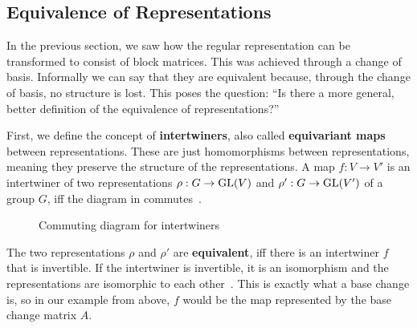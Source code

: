 \subsection{Equivalence of Representations}
\label{sec:basics.equ}

In the previous section, we saw how the regular representation can be transformed to consist of block matrices.
This was achieved through a change of basis.
Informally we can say that they are equivalent because, through the change of basis, no structure is lost.
This poses the question:
``Is there a more general, better definition of the equivalence of representations?''

First, we define the concept of \textbf{intertwiners}, also called \textbf{equivariant maps} between representations.
These are just homomorphisms between representations, meaning they preserve the structure of the representations.
A map $f: V \to V'$ is an intertwiner of two representations $\rho: G \to \operatorname{GL}(V)$ and $\rho': G \to \operatorname{GL}(V')$ of a group $G$, iff the diagram in  commutes~\cite{fuchs2003}.

\begin{figure}[h]
    \centering
    \caption{Commuting diagram for intertwiners}
    \label{fig:main.what.equ-cd}
\end{figure}

The two representations $\rho$ and $\rho'$ are \textbf{equivalent}, iff there is an intertwiner $f$ that is invertible.
If the intertwiner is invertible, it is an isomorphism and the representations are isomorphic to each other~\cite{hein2013,fuchs2003}.
This is exactly what a base change is, so in our example from above, $f$ would be the map represented by the base change matrix $A$.
